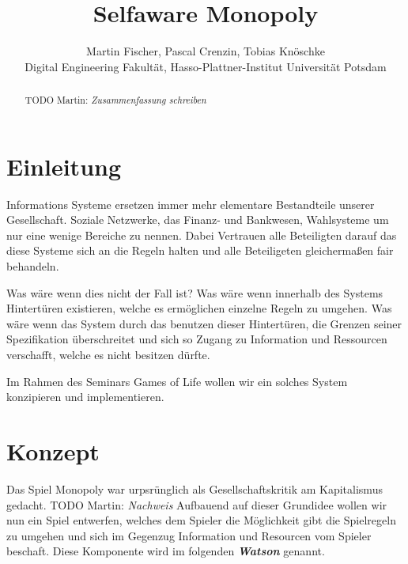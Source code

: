 \documentclass[german]{cgspaper} %
\title{Selfaware Monopoly}
\author{Martin Fischer, Pascal Crenzin, Tobias Knöschke\\ Digital Engineering Fakultät, Hasso-Plattner-Institut \textbar{} Universität Potsdam}
\newcommand{\todo}[1]{\textit{#1}}
\newcommand{\Martin}[1]{\textcolor{colorMartin}{TODO Martin:} \todo{#1} }
\newcommand{\neuerBegriff}[1]{\textbf{\textit{#1}}}
\begin{document}

\maketitle

\begin{abstract}
    \Martin{Zusammenfassung schreiben}
\end{abstract}

\copyrightspace %


\section{Einleitung}

Informations Systeme ersetzen immer mehr elementare Bestandteile unserer Gesellschaft.
Soziale Netzwerke, das Finanz- und Bankwesen, Wahlsysteme um nur eine wenige Bereiche zu nennen.
Dabei Vertrauen alle Beteiligten darauf das diese Systeme sich an die Regeln halten und alle Beteiligeten gleichermaßen fair behandeln.

Was wäre wenn dies nicht der Fall ist? 
Was wäre wenn innerhalb des Systems Hintertüren existieren, welche es ermöglichen einzelne Regeln zu umgehen.
Was wäre wenn das System durch das benutzen dieser Hintertüren, die Grenzen seiner Spezifikation überschreitet und sich so Zugang zu Information und Ressourcen verschafft, welche es nicht besitzen dürfte.

Im Rahmen des Seminars Games of Life wollen wir ein solches System konzipieren und implementieren.

\section{Konzept}

Das Spiel Monopoly war urpsrünglich als Gesellschaftskritik am Kapitalismus gedacht. \Martin{Nachweis} 
Aufbauend auf dieser Grundidee wollen wir nun ein Spiel entwerfen, welches dem Spieler die Möglichkeit gibt die Spielregeln zu umgehen und sich im Gegenzug Information und Resourcen vom Spieler beschaft. 
Diese Komponente wird im folgenden \neuerBegriff{Watson} genannt.
\end{document}
